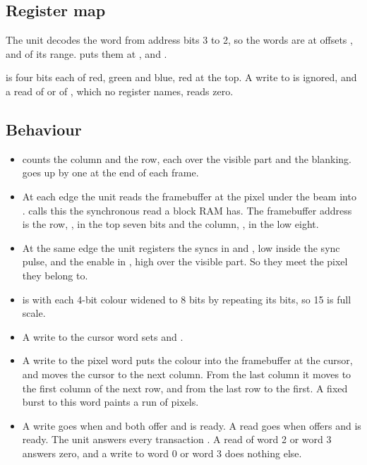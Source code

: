 \subsection*{Register map}

The unit decodes the word from address bits 3 to 2, so the words are at
offsets ,  and  of its range.
 puts them at ,  and
.


 is four bits each of red, green and blue, red at the top.
A write to  is ignored, and a read of  or of
, which no register names, reads zero.


\subsection*{Behaviour}

\begin{itemize}
\item {} counts the column and  the row, each over the
visible part and the blanking.  goes up by one at the end
of each frame.
\item At each edge the unit reads the framebuffer at the pixel under
the beam into .  calls this the synchronous
read a block RAM has. The framebuffer address is the row,
, in the top seven bits and the column,
, in the low eight.
\item At the same edge the unit registers the syncs in  and
, low inside the sync pulse, and the enable in
, high over the visible part. So they meet the pixel they
belong to.
\item {} is  with each 4-bit colour widened to 8 bits
by repeating its bits, so 15 is full scale.
\item A write to the cursor word sets  and .
\item A write to the pixel word puts the colour into the framebuffer at
the cursor, and moves the cursor to the next column. From the last
column it moves to the first column of the next row, and from the last
row to the first. A fixed burst to this word paints a run of pixels.
\item A write goes when  and  both offer
and  is ready. A read goes when  offers and
 is ready. The
unit answers every transaction . A read of word 2 or word 3
answers zero, and a write to word 0 or word 3 does nothing else.
\end{itemize}

